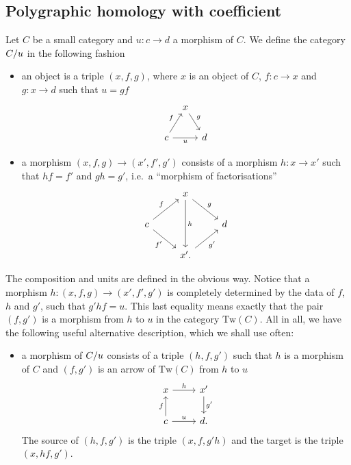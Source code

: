\documentclass{amsart}
\newcommand{\Tw}[1]{\mathrm{Tw}(#1)}
\newcommand{\id}{\mathrm{id}}
\renewcommand{\tge}[1]{\target{} #1}
\renewcommand{\homset}[3]{\mathrm{Hom}_{#1}(#2,#3)}
\begin{document}
\subsection{Polygraphic homology with coefficient}
\begin{paragr}
  Let $C$ be a small category and $u \colon c \to d$ a morphism of
  $C$. We define the category $C/u$ in the following fashion
  \begin{itemize}
  \item an object is a triple $(x,f,g)$, where $x$ is an object of
    $C$, $f \colon c \to x$ and $g \colon x \to d$ such that $u=gf$
    \[
      \begin{tikzcd}[column sep=tiny]
        &x\ar[dr,"g"]&\\
        c \ar[ur,"f"]\ar[rr,"u"'] & &d
      \end{tikzcd}
    \]
  \item a morphism $(x,f,g) \to (x',f',g')$ consists of a morphism $h
    \colon x \to x'$ such that $h f = f'$ and $g h=g'$,
    i.e.\ a ``morphism of factorisations''
    \[
      \begin{tikzcd}
        & x \ar[dr,"g"]\ar[dd,"h"]&\\
        c \ar[ur,"f"] \ar[dr,"f'"'] & & d \\
        & x'. \ar[ur,"g'"']& 
      \end{tikzcd}
    \]
    \end{itemize}
    The composition and units are defined in the obvious way. Notice that a morphism $h \colon (x,f,g) \to (x',f',g')$ is
    completely determined by the data of $f$, $h$ and $g'$, such that
    $g'hf = u$. This last equality means exactly that the pair
    $(f,g')$ is a morphism from $h$ to $u$ in the category
    $\Tw{C}$. All in all, we
    have the following useful alternative description, which we shall
    use often:
    \begin{itemize}
    \item a morphism of $C/u$ consists of a triple $(h,f,g')$
      such that $h$ is a morphism of $C$ and $(f,g')$ is an arrow of
      $\Tw{C}$ from $h$ to $u$
      \[
        \begin{tikzcd}
          x \ar[r,"h"]& x' \ar[d,"g'"]\\
          c\ar[u,"f"] \ar[r,"u"] & d.
        \end{tikzcd}
      \]
      The source of $(h,f,g')$ is the triple $(x,f,g'h)$ and the target
      is the triple $(x,hf,g')$.
    \end{itemize}
    
  \end{paragr}
\end{document}

